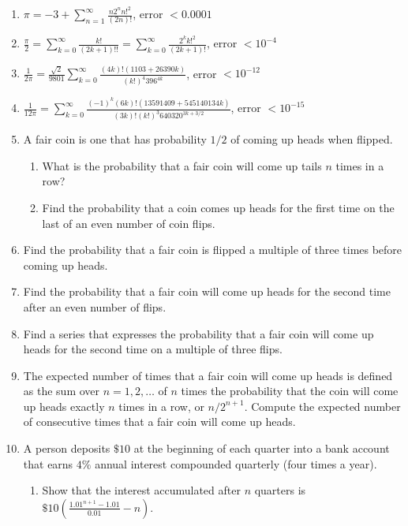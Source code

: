 \documentclass{exercises}
\begin{document}
\begin{enumerate}[resume]
\item \techrequired $\pi=-3+\sum_{n=1}^{\infty}\frac{n2^{n}n!^{2}}{(2n)!}$, error $<0.0001$
\item \techrequired $\frac{\pi}{2}=\sum_{k=0}^{\infty}\frac{k!}{(2k+1)!!}=\sum_{k=0}^{\infty}\frac{2^{k}k!^{2}}{(2k+1)!}$, error $<10^{-4}$
\item \techrequired $\frac{1}{2\pi}=\frac{\sqrt{2}}{9801}\sum_{k=0}^{\infty}\frac{(4k)!(1103+26390k)}{{(k!)}^{4}396^{4k}}$, error $<10^{-12}$
\item \techrequired $\frac{1}{12\pi}=\sum_{k=0}^{\infty}\frac{{(-1)}^{k}(6k)!(13591409+545140134k)}{(3k)!{(k!)}^{3}640320^{3k+3/2}}$, error $<10^{-15}$
\item \techrequired A fair coin is one that has probability $1/2$ of coming up heads when flipped.
\begin{enumerate}[label=(\alph*)]
  \item What is the probability that a fair coin will come up tails $n$ times in a row?
  \item Find the probability that a coin comes up heads for the first time on the last of an even number of coin flips.
\end{enumerate}
\item \techrequired Find the probability that a fair coin is flipped a multiple of three times before coming up heads.
\item \techrequired Find the probability that a fair coin will come up heads for the second time after an even number of flips.
\item \techrequired Find a series that expresses the probability that a fair coin will come up heads for the second time on a multiple of three flips.
\item \techrequired The expected number of times that a fair coin will come up heads is defined as the sum over $n=1,2,\ldots$ of $n$ times the probability that the coin will come up heads exactly $n$ times in a row, or $n/2^{n+1}$. Compute the expected number of consecutive times that a fair coin will come up heads.
\item \techrequired A person deposits $\$10$ at the beginning of each quarter into a bank account that earns $4\%$ annual interest compounded quarterly (four times a year).
\begin{enumerate}[label=(\alph*)]
  \item Show that the interest accumulated after $n$ quarters is $\$10(\frac{1.01^{n+1}-1.01}{0.01}-n)$.

\end{enumerate}
\end{enumerate}
\end{document}
